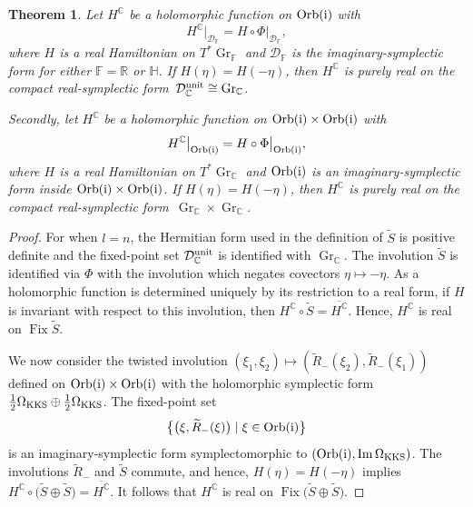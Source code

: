 \documentclass[pdftex]{sigma}
\numberwithin{equation}{section}
\newtheorem{Theorem}{Theorem}[section]
\DeclareMathOperator{\fix}{Fix}
\DeclareMathOperator{\Imag}{Im}
\DeclareMathOperator{\Gr}{Gr}
\newcommand{\R}{\mathbb{R}}
\newcommand{\C}{\mathbb{C}}
\newcommand{\D}{\mathcal{D}}
\newcommand{\Q}{\mathbb{H}}
\begin{document}
	\begin{Theorem}\label{main_thm}
		Let $H^\C$ be a holomorphic function on ${\rm Orb}({\rm i})$ with
		\[
		H^\C\big|_{\D_\mathbb{F}}=H\circ\Phi\big|_{\D_\mathbb{F}},
		\]
		where $H$ is a real Hamiltonian on $T^*\Gr_\mathbb{F}$ and $\D_\mathbb{F}$ is the imaginary-symplectic form for either $\mathbb{F}=\R$ or $\Q$. If $H(\eta)=H(-\eta)$, then $H^\C$ is purely real on the compact real-symplectic form~${\D_{\C}^{\rm unit}\cong\Gr_\C}$.
		
		Secondly, let $H^\C$ be a holomorphic function on ${\rm Orb}({\rm i})\times{\rm Orb}({\rm i})$ with
		\[
		H^\C\big|_{{\rm Orb}({\rm i})}=H\circ\Phi\big|_{{\rm Orb}({\rm i})},
		\]
		where $H$ is a real Hamiltonian on $T^*\Gr_\C$ and ${\rm Orb}({\rm i})$ is an imaginary-symplectic form inside ${\rm Orb}({\rm i})\times{\rm Orb}({\rm i})$. If $H(\eta)=H(-\eta)$, then $H^\C$ is purely real on the compact real-symplectic form~$\Gr_\C\times\Gr_\C$.
	\end{Theorem}
	\begin{proof}
		For when $l=n$, the Hermitian form used in the definition of $\widetilde{S}$ is positive definite and the fixed-point set $\D_{\C}^{\rm unit}$ is identified with $\Gr_\C$. The involution $\widetilde{S}$ is identified via $\Phi$ with the involution which negates covectors $\eta\mapsto -\eta$. As a holomorphic function is determined uniquely by its restriction to a real form, if $H$ is invariant with respect to this involution, then $H^\C\circ\widetilde{S}=\overline{H^\C}$. Hence, $H^\C$ is real on $\fix\widetilde{S}$.
		
		We now consider the twisted involution $(\xi_1,\xi_2)\mapsto (\widetilde{R}_-(\xi_2),\widetilde{R}_-(\xi_1))$ defined on ${\rm Orb}({\rm i})\times{\rm Orb}({\rm i})$ with the holomorphic symplectic form $\frac{1}{2}\Omega_{\rm KKS}\oplus\frac{1}{2}\Omega_{\rm KKS}$. The fixed-point set
		\begin{equation}\label{conj_diag}
			\big\{\bigl(\xi,\widetilde{R}_-(\xi)\bigr)\mid \xi\in{\rm Orb}({\rm i})\big\}
		\end{equation}
		is an imaginary-symplectic form symplectomorphic to $({\rm Orb}({\rm i}),\Imag\Omega_{\rm KKS})$. The involutions $\widetilde{R}_-$ and $\widetilde{S}$ commute, and hence, $H(\eta)=H(-\eta)$ implies $H^\C\circ\bigl(\widetilde{S}\oplus\widetilde{S}\bigr)=\overline{H^\C}$. It follows that $H^\C$ is real on $\fix\bigl(\widetilde{S}\oplus\widetilde{S}\bigr)$.
	\end{proof}
\end{document}
